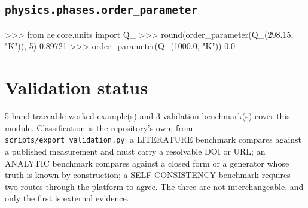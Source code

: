 \documentclass[10pt,a4paper,twoside]{report}
\begin{document}
\subsection*{\texttt{physics.phases.order\_parameter}}

\begin{doctestblock}
>>> from ae.core.units import Q_
>>> round(order_parameter(Q_(298.15, "K")), 5)
0.89721
>>> order_parameter(Q_(1000.0, "K"))
0.0
\end{doctestblock}

\section{Validation status}

5 hand-traceable worked example(s) and 3 validation benchmark(s) cover this module. Classification is the repository's own, from \texttt{scripts/export\_validation.py}: a LITERATURE benchmark compares against a published measurement and must carry a resolvable DOI or URL; an ANALYTIC benchmark compares against a closed form or a generator whose truth is known by construction; a SELF-CONSISTENCY benchmark requires two routes through the platform to agree. The three are not interchangeable, and only the first is external evidence.

\footnotesize
\end{document}
